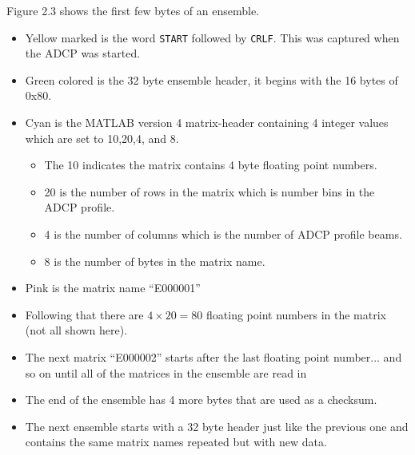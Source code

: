 Figure 2.3 shows the first few bytes of an ensemble.
\begin{itemize}
\item Yellow marked is the word \texttt{START} followed by \texttt{CRLF}. This was captured when the ADCP was started.
\item Green colored is the 32 byte ensemble header, it begins with the 16 bytes of 0x80.
\item Cyan is the MATLAB version 4 matrix-header containing 4 integer values which are set to 10,20,4, and 8.  
\begin{itemize}
\item The 10 indicates the matrix contains 4 byte floating point numbers. 
\item 20 is the number of rows in the matrix which is number bins in the ADCP profile. 
\item 4 is the number of columns which is the number of ADCP profile beams.  
\item 8 is the number of bytes in the matrix name.  
\end{itemize}
\item Pink is the matrix name ``E000001''
\item Following that there are $4 \times 20 = 80$  floating point numbers in the matrix (not all shown here).
\item The next matrix ``E000002'' starts after the last floating point number... and so on until all of the matrices in the ensemble are read in
\item The end of the ensemble has 4 more bytes that are used as a checksum. 
\item The next ensemble starts with a 32 byte header just like the previous one and contains the same matrix names repeated but with new data. 
\end{itemize}

